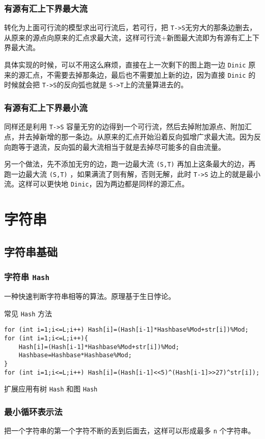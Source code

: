 \documentclass[UTF-8]{ctexart}
\begin{document}
	\subsubsection{有源有汇上下界最大流}
	
	转化为上面可行流的模型求出可行流后，若可行，把 \texttt{T->S}无穷大的那条边删去，从原来的源点向原来的汇点求最大流，这样可行流+新图最大流即为有源有汇上下界最大流。  
	
	具体实现的时候，可以不用这么麻烦，直接在上一次剩下的图上跑一边 \texttt{Dinic} 原来的源汇点，不需要去掉那条边，最后也不需要加上新的边，因为直接 \texttt{Dinic} 的时候就会把 \texttt{T->S}的反向弧也就是 \texttt{S->T}上的流量算进去的。
	
	\subsubsection{有源有汇上下界最小流}
	
	同样还是利用 \texttt{T->S} 容量无穷的边得到一个可行流，然后去掉附加源点、附加汇点，并去掉新增的那一条边。从原来的汇点开始沿着反向弧增广求最大流。因为反向跑等于退流，反向弧的最大流相当于就是去掉尽可能多的自由流量。  
	
	另一个做法，先不添加无穷的边，跑一边最大流 \texttt{(S,T)} 再加上这条最大的边，再跑一边最大流 \texttt{(S,T)} ，如果满流了则有解，否则无解，此时 \texttt{T->S} 边上的就是最小流。这样可以更快地 \texttt{Dinic}，因为两边都是同样的源汇点。
	\newpage
	\section{字符串}
	\subsection{字符串基础}
	\subsubsection{字符串 \texttt{Hash}}
	一种快速判断字符串相等的算法。原理基于生日悖论。
	
	常见 \texttt{Hash} 方法
\begin{verbatim}
for (int i=1;i<=L;i++) Hash[i]=(Hash[i-1]*Hashbase%Mod+str[i])%Mod;
for (int i=1;i<=L;i++){
    Hash[i]=(Hash[i-1]*Hashbase%Mod+str[i])%Mod;
    Hashbase=Hashbase*Hashbase%Mod;
}
for (int i=1;i<=L;i++) Hash[i]=(Hash[i-1]<<5)^(Hash[i-1]>>27)^str[i]);
\end{verbatim}
	扩展应用有树 \texttt{Hash} 和图 \texttt{Hash}
	\subsubsection{最小循环表示法}
	把一个字符串的第一个字符不断的丢到后面去，这样可以形成最多 \texttt{n} 个字符串。
	
\end{document}
